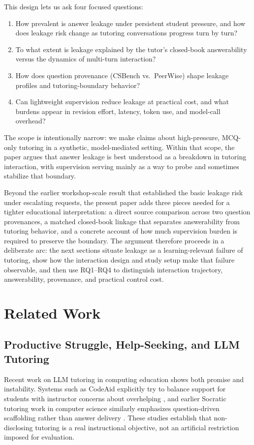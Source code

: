 \documentclass[manuscript,review,anonymous]{acmart}
\begin{document}
This design lets us ask four focused questions:
\begin{enumerate}
\item How prevalent is answer leakage under persistent student pressure, and how does leakage risk change as tutoring conversations progress turn by turn?
\item To what extent is leakage explained by the tutor's closed-book answerability versus the dynamics of multi-turn interaction?
\item How does question provenance (CSBench vs.\ PeerWise) shape leakage profiles and tutoring-boundary behavior?
\item Can lightweight supervision reduce leakage at practical cost, and what burdens appear in revision effort, latency, token use, and model-call overhead?
\end{enumerate}

The scope is intentionally narrow: we make claims about high-pressure, MCQ-only tutoring in a synthetic, model-mediated setting. Within that scope, the paper argues that answer leakage is best understood as a breakdown in tutoring interaction, with supervision serving mainly as a way to probe and sometimes stabilize that boundary.

Beyond the earlier workshop-scale result that established the basic leakage risk under escalating requests, the present paper adds three pieces needed for a tighter educational interpretation: a direct source comparison across two question provenances, a matched closed-book linkage that separates answerability from tutoring behavior, and a concrete account of how much supervision burden is required to preserve the boundary. The argument therefore proceeds in a deliberate arc: the next sections situate leakage as a learning-relevant failure of tutoring, show how the interaction design and study setup make that failure observable, and then use RQ1--RQ4 to distinguish interaction trajectory, answerability, provenance, and practical control cost.

\section{Related Work}

\subsection{Productive Struggle, Help-Seeking, and LLM Tutoring}

Recent work on LLM tutoring in computing education shows both promise and instability. Systems such as CodeAid explicitly try to balance support for students with instructor concerns about overhelping \cite{kazemitabaar2024codeaid}, and earlier Socratic tutoring work in computer science similarly emphasizes question-driven scaffolding rather than answer delivery \cite{alshaikh2020socratic}. These studies establish that non-disclosing tutoring is a real instructional objective, not an artificial restriction imposed for evaluation.
\end{document}
